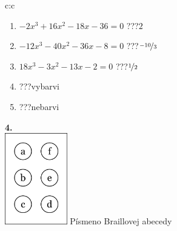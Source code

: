 \documentclass[10pt]{report}
\begin{document}
\begin{tabular}{c:c}
\begin{minipage}[c][104.5mm][t]{0.5\linewidth}
\begin{center}
\begin{minipage}{0.79\linewidth}
\begin{center}
\begin{varwidth}{\linewidth}
\begin{enumerate}
\item $-2x^3+16x^2-18x-36=0$\quad \dotfill\; ???\;\dotfill \quad $2$
\item $-12x^3-40x^2-36x-8=0$\quad \dotfill\; ???\;\dotfill \quad $\nicefrac{-10}{3}$
\item $18x^3-3x^2-13x-2=0$\quad \dotfill\; ???\;\dotfill \quad $\nicefrac{1}{2}$
\item \quad \dotfill\; ???\;\dotfill \quad vybarvi
\item \quad \dotfill\; ???\;\dotfill \quad nebarvi
\end{enumerate}
\end{varwidth}
\end{center}
\end{minipage}
\begin{minipage}{0.20\linewidth}
\begin{center}
{\Huge\bfseries 4.} \\[2mm]
\includegraphics[height=40mm]{../images/braille.png}
{\small Písmeno Braillovej abecedy}
\end{center}
\end{minipage}
\end{center}
\end{minipage}
%
\end{tabular}
\newpage
\thispagestyle{empty}
\end{document}
